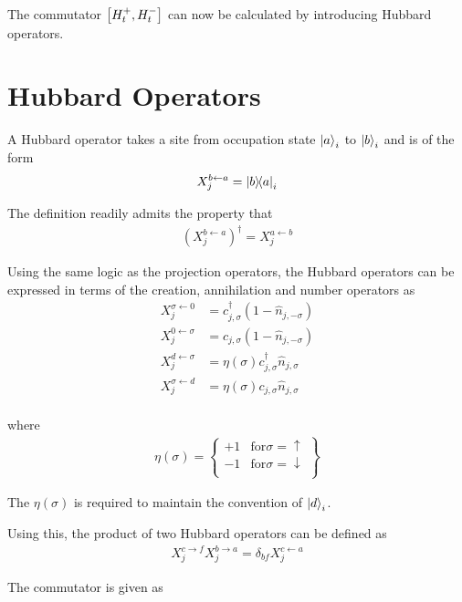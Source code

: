 \documentclass[]{report}
\begin{document}
The commutator $ \comm{H^{+}_{t}}{H^{-}_{t}} $ can now be calculated by introducing Hubbard operators.

\section{Hubbard Operators}
A Hubbard operator takes a site from occupation state $ \ket{a}_i $ to $ \ket{b}_i $ and is of the form
\begin{align}
X^{b \leftarrow a}_{j} = \op{b}{a}_i
\end{align}

The definition readily admits the property that
\begin{align}
\left( X^{b \leftarrow a}_{j}\right) ^{\dagger} = X^{a \leftarrow b}_{j}
\end{align}

Using the same logic as the projection operators, the Hubbard operators can be expressed in terms of the creation, annihilation and number operators as
\begin{align}
X^{\sigma \leftarrow 0}_{j} &= c^{\dagger}_{j, \sigma} (1 - \hat{n}_{j, -\sigma})\\
X^{0 \leftarrow \sigma}_{j} &= c_{j, \sigma} (1 - \hat{n}_{j, -\sigma})\\
X^{d \leftarrow \sigma}_{j} &= \eta(\sigma) c^{\dagger}_{j, \sigma} \hat{n}_{j, \sigma} \\
X^{\sigma \leftarrow d}_{j} &= \eta(\sigma) c_{j, \sigma} \hat{n}_{j, \sigma} \\
\end{align}

where
\begin{align}
\eta(\sigma) = \left.
\begin{cases}
+1 & \text{for} \sigma = \uparrow\\
-1 & \text{for} \sigma = \downarrow\\
\end{cases}
\right\}
\end{align}

The $ \eta(\sigma) $ is required to maintain the convention of $ \ket{d}_i $.

Using this, the product of two Hubbard operators can be defined as
\begin{align}
X^{c \rightarrow f}_{j} X^{b \rightarrow a}_{j} = \delta_{bf} X^{c \leftarrow a}_{j}
\end{align}

The commutator is given as
\end{document}
